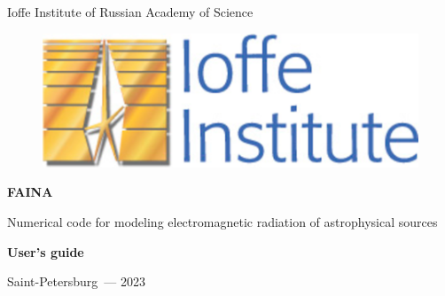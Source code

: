 \thispagestyle{empty}



\begin{center}
{
Ioffe Institute of Russian Academy of Science\\
}
\end{center}

\begin{figure}
	\centering
	\includegraphics[width=5.5 cm]{./fig/ioffe.png} 
\end{figure}



\vspace{5mm}
\begin{center}
{\bf \Huge FAINA
\par}
\vspace{10mm}
Numerical code for modeling electromagnetic radiation of astrophysical sources

\vspace{10mm}
{\bf \large User's guide \par}
\end{center}




\vspace{120mm}
\begin{center}
{Saint-Petersburg~--- 2023}
\end{center}

\newpage